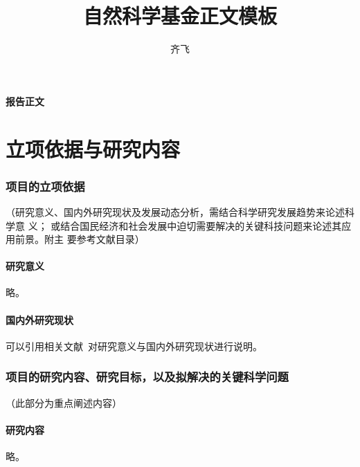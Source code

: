 \documentclass[subfig]{mynsfc}
\title{自然科学基金正文\XeLaTeX{}模板}
\author{齐飞}
\begin{document}
\thispagestyle{empty}

\begin{center}
  \kaiti \erhao \bfseries 报告正文
\end{center}

\part{立项依据与研究内容}
\label{part:proposal}

\section{项目的立项依据}
\label{sec:background}

\begin{hcomment}
  （研究意义、国内外研究现状及发展动态分析，需结合科学研究发展趋势来论述科学意
  义； 或结合国民经济和社会发展中迫切需要解决的关键科技问题来论述其应用前景。附主
  要参考文献目录）
\end{hcomment}

\subsection{研究意义}
\label{sec:motivation}

略。

\subsection{国内外研究现状}
\label{sec:review}

可以引用相关文献~\cite{bengio_representation_2013}对研究意义与国内外研究现状进行说明。

\printbibliography[heading=reftype,title={参考文献}]

\section{项目的研究内容、研究目标，以及拟解决的关键科学问题}
\label{sec:contents}

\begin{hcomment}
  （此部分为重点阐述内容）
\end{hcomment}

\subsection{研究内容}

略。
\end{document}
